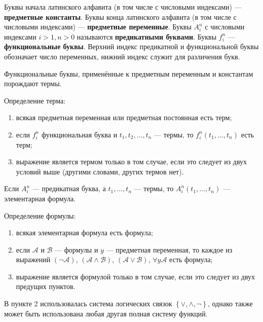 Буквы начала латинского алфавита (в том числе с числовыми индексами) ---
\textbf{предметные константы}. Буквы конца латинского алфавита (в том числе с числовыми
индексами) --- \textbf{предметные переменные}. Буквы $A_i^n$ с числовыми индексами $i>1,
n>0$ называются \textbf{предикатными буквами}. Буквы $f_i^n$ ---
\textbf{функциональные буквы}. Верхний индекс предикатной и функциональной буквы
обозначает число переменных, нижний индекс служит для различения букв. 

Функциональные буквы, применённые к предметным переменным и константам порождают
термы. 
\begin{definition}
	Определение терма:
	\begin{enumerate}
		\item всякая предметная переменная или предметная постоянная
			есть терм;
		\item если $f_i^n$ функциональная буква и $t_1, t_2, \ldots,
			t_n$ --- термы, то $f_i^n(t_1, \ldots, t_n)$ есть терм;
		\item выражение является термом только в том случае, если это
			следует из двух условий выше (другими словами, других
			термов нет).
	\end{enumerate}
\end{definition}
 \begin{definition}
	 Если $A_i^n$ --- предикатная буква, а $t_1,\ldots, t_n$ --- термы, то
	 $A_i^n(t_1, \ldots, t_n)$ --- элементарная формула.
\end{definition}
\begin{definition}
	Определение формулы:
	\begin{enumerate}
		\item всякая элементарная формула есть формула;
		\item если $\mathcal{A}$ и $\mathcal{B}$ --- формулы и $y$ ---
			предметная переменная, то каждое из выражений $\left(
			\lnot \mathcal{A} \right) $, $\left( \mathcal{A} \land
		\mathcal{B} \right) $, $(\mathcal{A} \lor \mathcal{B})$,
		$\forall y \mathcal{A}$ есть формула;
	\item выражение является формулой только в том случае, если это следует
		из двух предущих пунктов.
	\end{enumerate}
\end{definition}
В пункте 2 использовалась система логических связок $\left\{ \lor, \land, \lnot
\right\} $, однако также может быть использована любая другая полная систему
функций.

